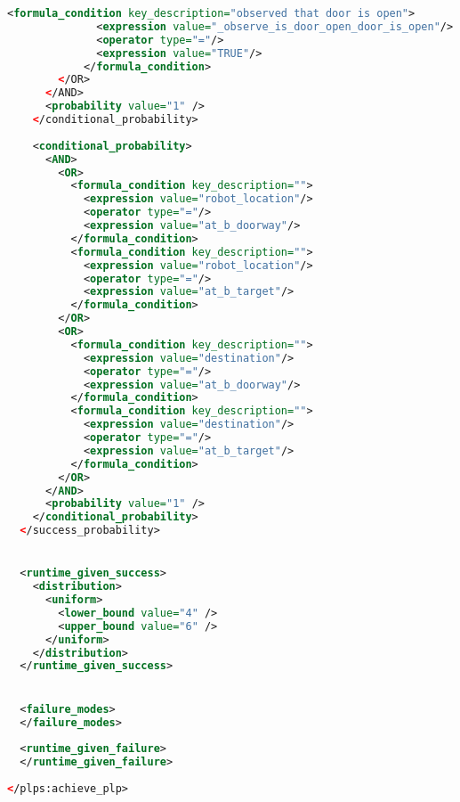 \begin{lstlisting}[style=stylexml,language=XML]
            <formula_condition key_description="observed that door is open">
              <expression value="_observe_is_door_open_door_is_open"/>
              <operator type="="/>
              <expression value="TRUE"/>
            </formula_condition>
        </OR>
      </AND>
      <probability value="1" />
    </conditional_probability>
    
    <conditional_probability>
      <AND>
        <OR>
          <formula_condition key_description="">
            <expression value="robot_location"/>
            <operator type="="/>
            <expression value="at_b_doorway"/>
          </formula_condition>
          <formula_condition key_description="">
            <expression value="robot_location"/>
            <operator type="="/>
            <expression value="at_b_target"/>
          </formula_condition>
        </OR>
        <OR>
          <formula_condition key_description="">
            <expression value="destination"/>
            <operator type="="/>
            <expression value="at_b_doorway"/>
          </formula_condition>
          <formula_condition key_description="">
            <expression value="destination"/>
            <operator type="="/>
            <expression value="at_b_target"/>
          </formula_condition>
        </OR>
      </AND>
      <probability value="1" />
    </conditional_probability>
  </success_probability>


  <runtime_given_success>
    <distribution>
      <uniform>
        <lower_bound value="4" />
        <upper_bound value="6" />
      </uniform>
    </distribution>
  </runtime_given_success>


  <failure_modes>
  </failure_modes>
  
  <runtime_given_failure>
  </runtime_given_failure>
  
</plps:achieve_plp>
	\end{lstlisting}
